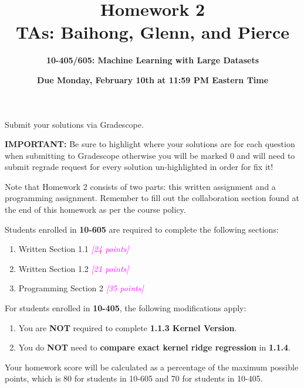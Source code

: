 \documentclass{exam}
\newcommand{\grade}[1]{\small\textcolor{magenta}{\emph{[#1 points]}} \normalsize}
\begin{document}
\title{\textbf{\Large Homework 2}\\[0.5em] 
\normalsize{TAs: Baihong, Glenn, and Pierce}}
\author{\Large \bf 10-405/605: Machine Learning with Large Datasets}
\date{{\bf Due Monday, February 10th at 11:59 PM Eastern Time}}
\maketitle

\noindent Submit your solutions via Gradescope.

\bigskip

\noindent \textbf{IMPORTANT:} Be sure to highlight where your solutions are for each question when submitting to Gradescope otherwise you will be marked 0 and will need to submit regrade request for every solution un-highlighted in order for fix it! 

\bigskip

\noindent Note that Homework 2 consists of two parts: this written assignment and a programming assignment. Remember to fill out the collaboration section found at the end of this homework as per the course policy.

\bigskip

\noindent Students enrolled in \textbf{10-605} are required to complete the following sections:
\begin{enumerate}
    \item  Written Section 1.1 \grade{24}
    \item  Written Section 1.2 \grade{21}
    \item Programming Section 2 \grade{35}
\end{enumerate}

\noindent For students enrolled in \textbf{10-405}, the following modifications apply:
\begin{enumerate}
    \item  You are \textbf{NOT} required to complete \textbf{1.1.3 Kernel Version}.
    \item  You do \textbf{NOT} need to \textbf{compare exact kernel ridge regression} in \textbf{1.1.4}.
\end{enumerate}

Your homework score will be calculated as a percentage of the maximum possible points, which is 80 for students in 10-605 and 70 for students in 10-405.

\clearpage

\clearpage

\clearpage

\end{document}
